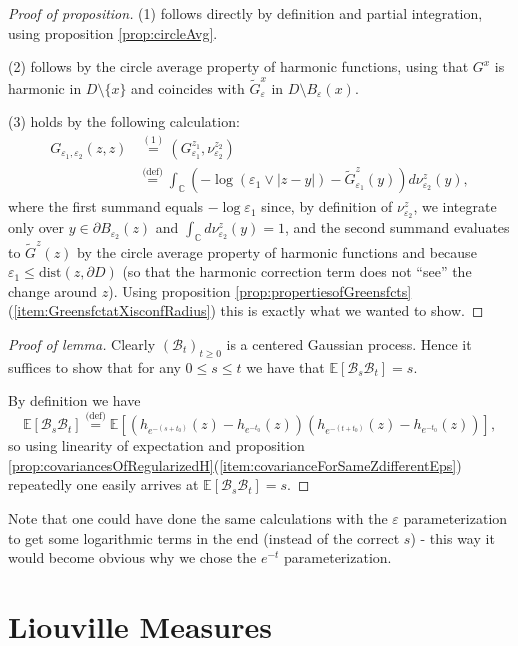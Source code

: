\documentclass[11pt,reqno]{amsart}
\numberwithin{equation}{section}
\newcommand{\eqby}[1]{\mathrel{\stackrel{#1}{=}}}
\newcommand{\eqbydef}{\mathrel{\stackrel{\text{(def)}}{=}}}
\newcommand{\eps}{\varepsilon}
\begin{document}
\begin{proof}[Proof of proposition]
	(1) follows directly by definition and partial integration, using proposition \ref{prop:circleAvg}.
	
	(2) follows by the circle average property of harmonic functions, using that $G^x$ is harmonic in $D\setminus\{x\}$ and coincides with $\tilde G^x_\eps$ in $D\setminus B_\eps(x)$.
	
	(3) holds by the following calculation:
	\begin{align*}
		G_{\eps_1,\eps_2}(z,z)&\eqby{(1)}(G_{\eps_1}^{z_1},\nu_{\eps_2}^{z_2})\\
		&\eqbydef \int_\mathbb{C}(-\log(\eps_1\vee |z-y|)-\tilde G_{\eps_1}^z(y))d\nu_{\eps_2}^z(y),
	\end{align*}
	where the first summand equals $-\log\eps_1$ since, by definition of $\nu_{\eps_2}^z$, we integrate only over $y\in\partial B_{\eps_2}(z)$ and $\int_\mathbb{C}d\nu_{\eps_2}^z(y)=1$, and the second summand evaluates to $\tilde G^z(z)$ by the circle average property of harmonic functions and because $\eps_1\leq\text{dist}(z,\partial D)$ (so that the harmonic correction term does not ``see'' the change around $z$). Using proposition \ref{prop:propertiesofGreensfcts}(\ref{item:GreensfctatXisconfRadius}) this is exactly what we wanted to show.
\end{proof}

\begin{proof}[Proof of lemma]
	Clearly $(\mathcal B_t)_{t\geq 0}$ is a centered Gaussian process. Hence it suffices to show that for any $0\leq s\leq t$ we have that $\mathbb E[\mathcal B_s\mathcal B_t] = s$. 
	
	By definition we have $$\mathbb E[\mathcal B_s\mathcal B_t]\eqbydef \mathbb E[(h_{e^{-(s+t_0)}}(z)-h_{e^{-t_0}}(z))(h_{e^{-(t+t_0)}}(z)-h_{e^{-t_0}}(z))],$$ so using linearity of expectation and proposition \ref{prop:covariancesOfRegularizedH}(\ref{item:covarianceForSameZdifferentEps}) repeatedly one easily arrives at $\mathbb E[\mathcal B_s\mathcal B_t] = s$.
\end{proof}

Note that one could have done the same calculations with the $\eps$ parameterization to get some logarithmic terms in the end (instead of the correct $s$) - this way it would become obvious why we chose the $e^{-t}$ parameterization.

\section{Liouville Measures}
\end{document}
